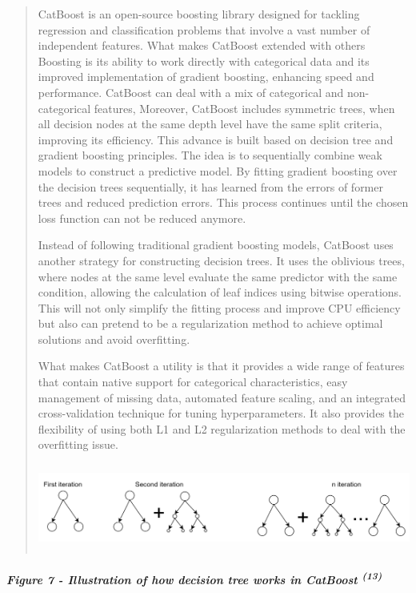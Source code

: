 \documentclass[
]{article}
\begin{document}
\begin{quote}
CatBoost is an open-source boosting library designed for tackling
regression and classification problems that involve a vast number of
independent features. What makes CatBoost extended with others Boosting
is its ability to work directly with categorical data and its improved
implementation of gradient boosting, enhancing speed and performance.
CatBoost can deal with a mix of categorical and non-categorical
features, Moreover, CatBoost includes symmetric trees, when all decision
nodes at the same depth level have the same split criteria, improving
its efficiency. This advance is built based on decision tree and
gradient boosting principles. The idea is to sequentially combine weak
models to construct a predictive model. By fitting gradient boosting
over the decision trees sequentially, it has learned from the errors of
former trees and reduced prediction errors. This process continues until
the chosen loss function can not be reduced anymore.

Instead of following traditional gradient boosting models, CatBoost uses
another strategy for constructing decision trees. It uses the oblivious
trees, where nodes at the same level evaluate the same predictor with
the same condition, allowing the calculation of leaf indices using
bitwise operations. This will not only simplify the fitting process and
improve CPU efficiency but also can pretend to be a regularization
method to achieve optimal solutions and avoid overfitting.

What makes CatBoost a utility is that it provides a wide range of
features that contain native support for categorical characteristics,
easy management of missing data, automated feature scaling, and an
integrated cross-validation technique for tuning hyperparameters. It
also provides the flexibility of using both L1 and L2 regularization
methods to deal with the overfitting issue.

\includegraphics[width=6.03496in,height=1.1205in]{vertopal_f239f640fefe43bb8bc0698cafd57825/media/image14.png}
\end{quote}

\hypertarget{figure-7---illustration-of-how-decision-tree-works-in-catboost-13}{%
\subparagraph{\texorpdfstring{\textbf{Figure 7} - Illustration of how
decision tree works in CatBoost
\textsuperscript{(13)}}{Figure 7 - Illustration of how decision tree works in CatBoost (13)}}\label{figure-7---illustration-of-how-decision-tree-works-in-catboost-13}}
\end{document}
